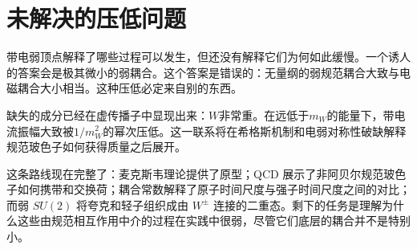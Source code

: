 \section{未解决的压低问题}

带电弱顶点解释了哪些过程可以发生，但还没有解释它们为何如此缓慢。一个诱人的答案会是极其微小的弱耦合。这个答案是错误的：无量纲的弱规范耦合大致与电磁耦合大小相当。这种压低必定来自别的东西。

缺失的成分已经在虚传播子中显现出来：\(W\)非常重。在远低于\(m_W\)的能量下，带电流振幅大致被\(1/m_W^2\)的幂次压低。这一联系将在希格斯机制和电弱对称性破缺解释规范玻色子如何获得质量之后展开。

\begin{classroomqa}
\end{classroomqa}

这条路线现在完整了：麦克斯韦理论提供了原型；QCD 展示了非阿贝尔规范玻色子如何携带和交换荷；耦合常数解释了原子时间尺度与强子时间尺度之间的对比；而弱 \(SU(2)\) 将夸克和轻子组织成由 \(W^\pm\) 连接的二重态。剩下的任务是理解为什么这些由规范相互作用中介的过程在实践中很弱，尽管它们底层的耦合并不是特别小。
